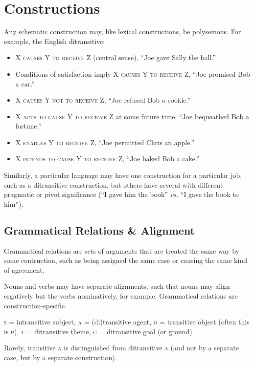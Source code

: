 \documentclass[11pt]{article}
\newcommand{\I}[1]{\textsc{#1}}   %
\newenvironment{grammarlist}%
 {\begin{itemize}\addtolength{\itemsep}{-0.5\baselineskip}\ignorespaces}%
 {\end{itemize}\ignorespacesafterend}
\begin{document}
\section{Constructions}
Any schematic construction may, like lexical constructions, be
polysemous.  For example, the English ditransitive:

\begin{grammarlist}
  \item \I{X causes Y to receive Z} (central sense), ``Joe gave Sally
    the ball.''
  \item Conditions of satisfaction imply \I{X causes Y to receive Z},
    ``Joe promised Bob a car.''
  \item \I{X causes Y not to receive Z}, ``Joe refused Bob a cookie.''
  \item \I{X acts to cause Y to receive Z} at some future time, ``Joe
    bequeathed Bob a fortune.''
  \item \I{X enables Y to receive Z}, ``Joe permitted Chris an
    apple.''
  \item \I{X intends to cause Y to receive Z}, ``Joe baked Bob a cake.''
\end{grammarlist}

Similarly, a particular language may have one construction for a
particular job, such as a ditransitive construction, but others have
several with different pragmatic or pivot significance (``I gave him
the book'' \textit{vs.} ``I gave the book to him'').


\subsection{Grammatical Relations \& Alignment}
Grammatical relations are sets of arguments that are treated the same
way by some contruction, such as being assigned the same case or
causing the same kind of agreement.

Nouns and verbs may have separate alignments, such that nouns may
align ergatively but the verbs nominatively, for example.  Grammatical
relations are construction-specific.

\I{s} = intransitive subject, \I{a} = (di)transitive agent, \I{o} =
transitive object (often this is \I{p}), \I{t} = ditransitive theme,
\I{g} = ditransitive goal (or ground).

Rarely, transitive \I{a} is distinguished from ditransitive \I{a} (and
not by a separate case, but by a separate construction).
\end{document}
